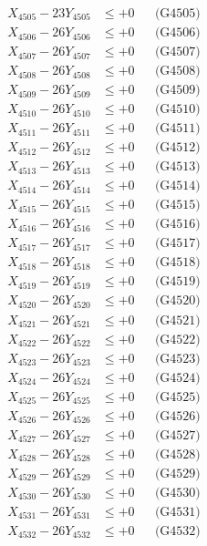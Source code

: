 \documentclass[a4paper,10pt]{article}
\begin{document}
{\begin{align}
X_{4505} - 23Y_{4505} &\leq +0 && \text{(G4505)} \\
X_{4506} - 26Y_{4506} &\leq +0 && \text{(G4506)} \\
X_{4507} - 26Y_{4507} &\leq +0 && \text{(G4507)} \\
X_{4508} - 26Y_{4508} &\leq +0 && \text{(G4508)} \\
X_{4509} - 26Y_{4509} &\leq +0 && \text{(G4509)} \\
X_{4510} - 26Y_{4510} &\leq +0 && \text{(G4510)} \\
\allowbreak
X_{4511} - 26Y_{4511} &\leq +0 && \text{(G4511)} \\
X_{4512} - 26Y_{4512} &\leq +0 && \text{(G4512)} \\
X_{4513} - 26Y_{4513} &\leq +0 && \text{(G4513)} \\
X_{4514} - 26Y_{4514} &\leq +0 && \text{(G4514)} \\
X_{4515} - 26Y_{4515} &\leq +0 && \text{(G4515)} \\
X_{4516} - 26Y_{4516} &\leq +0 && \text{(G4516)} \\
X_{4517} - 26Y_{4517} &\leq +0 && \text{(G4517)} \\
X_{4518} - 26Y_{4518} &\leq +0 && \text{(G4518)} \\
X_{4519} - 26Y_{4519} &\leq +0 && \text{(G4519)} \\
X_{4520} - 26Y_{4520} &\leq +0 && \text{(G4520)} \\
\allowbreak
X_{4521} - 26Y_{4521} &\leq +0 && \text{(G4521)} \\
X_{4522} - 26Y_{4522} &\leq +0 && \text{(G4522)} \\
X_{4523} - 26Y_{4523} &\leq +0 && \text{(G4523)} \\
X_{4524} - 26Y_{4524} &\leq +0 && \text{(G4524)} \\
X_{4525} - 26Y_{4525} &\leq +0 && \text{(G4525)} \\
X_{4526} - 26Y_{4526} &\leq +0 && \text{(G4526)} \\
X_{4527} - 26Y_{4527} &\leq +0 && \text{(G4527)} \\
X_{4528} - 26Y_{4528} &\leq +0 && \text{(G4528)} \\
X_{4529} - 26Y_{4529} &\leq +0 && \text{(G4529)} \\
X_{4530} - 26Y_{4530} &\leq +0 && \text{(G4530)} \\
\allowbreak
X_{4531} - 26Y_{4531} &\leq +0 && \text{(G4531)} \\
X_{4532} - 26Y_{4532} &\leq +0 && \text{(G4532)} \\

\end{align}}
\end{document}
